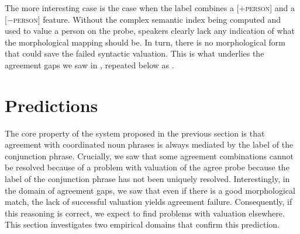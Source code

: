 \documentclass[output=paper,
modfonts
newtxmath,
hidelinks
]{langscibook}
\begin{document}
\noindent The more interesting case is the case when the label combines a [$+$\textsc{person}] and a [$-$\textsc{person}] feature. Without the complex semantic index being computed and used to value a person on the probe, speakers clearly lack any indication of what the morphological mapping should be. In turn, there is no morphological form that could save the failed syntactic valuation. This is what underlies the agreement gaps we saw in , repeated below as .

\ea\label{gaps-rep}
\smallskip
{}
\z\z

\section{Predictions}

The core property of the system proposed in the previous section is that agreement with coordinated noun phrases is always mediated by the label of the conjunction phrase. Crucially, we saw that some agreement combinations cannot be resolved because of a problem with valuation of the agree probe because the label of the conjunction phrase has not been uniquely resolved. Interestingly, in the domain of agreement gaps, we saw that even if there is a good morphological match, the lack of successful valuation yields agreement failure. Consequently, if this reasoning is correct, we expect to find problems with valuation elsewhere. This section investigates two empirical domains that confirm this prediction.
\end{document}
